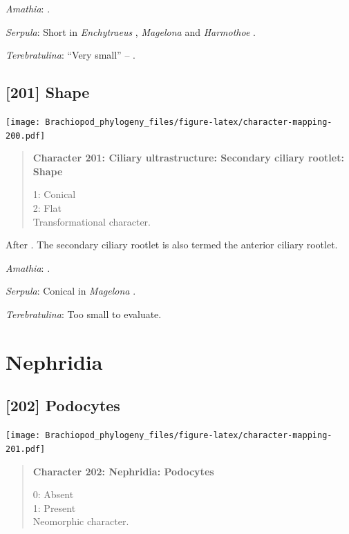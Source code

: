 \documentclass[openany]{book}
\begin{document}
\hypertarget{Amathia-coding-200}{}
\emph{Amathia}: \citet{Reed1982}.

\hypertarget{Serpula-coding-200}{}
\emph{Serpula}: Short in \emph{Enchytraeus} \citep{Reger1967},
\emph{Magelona} \citep{Bartolomaeus1995} and \emph{Harmothoe}
\citep{Holborow1969}.

\hypertarget{Terebratulina-coding-200}{}
\emph{Terebratulina}: ``Very small'' -- \citet{Luter1995}.

\subsection*{{[}201{]} Shape}\label{shape-1}

\texttt{[image: Brachiopod\_phylogeny\_files/figure-latex/character-mapping-200.pdf]}

\begin{quote}
\textbf{Character 201: Ciliary ultrastructure: Secondary ciliary
rootlet: Shape}

1: Conical\\
2: Flat\\
Transformational character.
\end{quote}

After \citet{Lundin2009}. The secondary ciliary rootlet is also termed
the anterior ciliary rootlet.

\hypertarget{Amathia-coding-201}{}
\emph{Amathia}: \citet{Reed1982}.

\hypertarget{Serpula-coding-201}{}
\emph{Serpula}: Conical in \emph{Magelona} \citep{Bartolomaeus1995}.

\hypertarget{Terebratulina-coding-201}{}
\emph{Terebratulina}: Too small to evaluate.

\section{Nephridia}\label{nephridia}

\subsection*{{[}202{]} Podocytes}\label{podocytes}

\texttt{[image: Brachiopod\_phylogeny\_files/figure-latex/character-mapping-201.pdf]}

\begin{quote}
\textbf{Character 202: Nephridia: Podocytes}

0: Absent\\
1: Present\\
Neomorphic character.
\end{quote}
\end{document}
